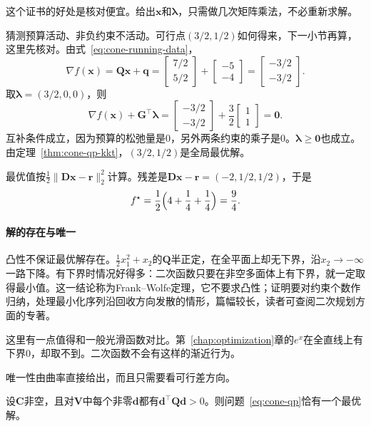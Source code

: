 这个证书的好处是核对便宜。给出$\bm{x}$和$\bm{\lambda}$，只需做几次矩阵乘法，不必重新求解。

\begin{example}[核对预算问题的解]
\label{ex:cone-qp-kkt}
猜测预算活动、非负约束不活动。可行点$(3/2,1/2)$如何得来，下一小节再算，这里先核对。由式~\eqref{eq:cone-running-data}，
\[
 \nabla f(\bm{x})=\bm{Q}\bm{x}+\bm{q}=\begin{bmatrix}7/2\\5/2\end{bmatrix}+\begin{bmatrix}-5\\-4\end{bmatrix}=\begin{bmatrix}-3/2\\-3/2\end{bmatrix}.
\]
取$\bm{\lambda}=(3/2,0,0)$，则
\[
 \nabla f(\bm{x})+\bm{G}^\top\bm{\lambda}=\begin{bmatrix}-3/2\\-3/2\end{bmatrix}+\frac32\begin{bmatrix}1\\1\end{bmatrix}=\bm{0}.
\]
互补条件成立，因为预算的松弛量是$0$，另外两条约束的乘子是$0$。$\bm{\lambda}\geq\bm{0}$也成立。由定理~\ref{thm:cone-qp-kkt}，$(3/2,1/2)$是全局最优解。

最优值按$\frac12\lVert\bm{D}\bm{x}-\bm{r}\rVert_2^2$计算。残差是$\bm{D}\bm{x}-\bm{r}=(-2,1/2,1/2)$，于是
\[
 f^\star=\frac12\Bigl(4+\frac14+\frac14\Bigr)=\frac94.
\]
\end{example}

\paragraph{解的存在与唯一}
凸性不保证最优解存在。$\frac12x_1^2+x_2$的$\bm{Q}$半正定，在全平面上却无下界，沿$x_2\to-\infty$一路下降。有下界时情况好得多：二次函数只要在非空多面体上有下界，就一定取得最小值。这一结论称为Frank--Wolfe定理，它不要求凸性；证明要对约束个数作归纳，处理最小化序列沿回收方向发散的情形，篇幅较长，读者可查阅二次规划方面的专著。

这里有一点值得和一般光滑函数对比。第~\ref{chap:optimization}章的$e^x$在全直线上有下界$0$，却取不到。二次函数不会有这样的渐近行为。

唯一性由曲率直接给出，而且只需要看可行差方向。

\begin{theorem}[存在唯一性的充分条件]
\label{thm:cone-qp-unique}
设$\bm{C}$非空，且对$\bm{V}$中每个非零$\bm{d}$都有$\bm{d}^\top\bm{Q}\bm{d}>0$。则问题~\eqref{eq:cone-qp}恰有一个最优解。
\end{theorem}

